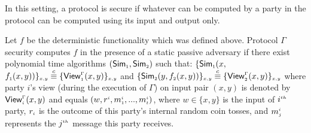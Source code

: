   
In this setting, a protocol is secure if whatever can be computed by a party in the protocol can be computed using its input and output only. 
 
 \vspace{-1mm}
 
\begin{definition}
Let $f$ be the deterministic functionality which was defined above. Protocol $\Gamma$ security computes $f$ in the presence of a static  passive adversary if there exist polynomial time algorithms $(\mathsf {Sim}_{\scriptscriptstyle 1}, \mathsf {Sim}_{\scriptscriptstyle 2})$ such that: 
%
{\small{
$
  \{\mathsf {Sim}_{\scriptscriptstyle 1}(x, $ $f_{\scriptscriptstyle 1}(x,y))\}_{\scriptscriptstyle x,y}\\\stackrel{c}{\equiv} \{\mathsf{View}_{\scriptscriptstyle 1}^{\scriptscriptstyle \Gamma}(x,y) \}_{\scriptscriptstyle x,y}$ and 
     $\{\mathsf{Sim}_{\scriptscriptstyle 2}(y, f_{\scriptscriptstyle 2}(x,y))\}_{\scriptscriptstyle x,y}\stackrel{c}{\equiv} \{\mathsf{View}_{\scriptscriptstyle 2}^{\scriptscriptstyle \Gamma}(x,y) \}_{\scriptscriptstyle x,y}
$}}
  where party $i$’s view (during the execution of $\Gamma$) on input pair  $(x, y)$ is denoted by $\mathsf{View}_{\scriptscriptstyle i}^{\scriptscriptstyle \Gamma}(x,y)$ and equals $(w, r^{\scriptscriptstyle i}, m_{\scriptscriptstyle 1}^{\scriptscriptstyle i}, ..., m_{\scriptscriptstyle t}^{\scriptscriptstyle i})$, where $w\in\{x,y\}$ is the input of $i^{\scriptscriptstyle th}$ party, $r_{\scriptscriptstyle i}$ is the outcome of this party's internal random coin tosses, and $m_{\scriptscriptstyle j}^{\scriptscriptstyle i}$ represents the $j^{\scriptscriptstyle th}$ message this party receives.  %
%
\end{definition}
 

  \vspace{-4.5mm}
  
